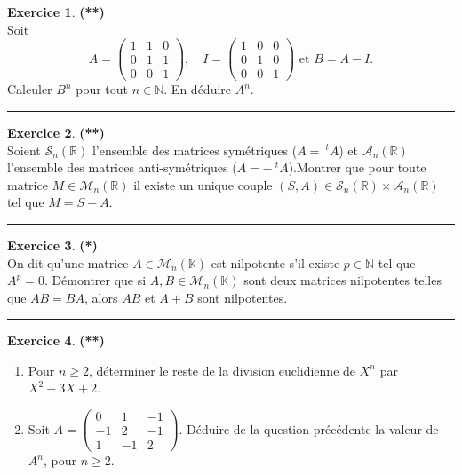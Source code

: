 \documentclass[a4paper,11pt]{article}
\theoremstyle{definition}
\newtheorem{exo}{Exercice} %
\begin{document}
\begin{minipage}{1\linewidth}
	\begin{minipage}[t]{0.48\linewidth}
		\raggedright
		
		
		
		
		\begin{exo}\textbf{(**)}\quad\\[0.2cm]
			Soit $$A=\left(
			\begin{array}{ccc}
			1&1&0\\
			0&1&1\\
			0&0&1
			\end{array}\right),\quad
			I=\left(
			\begin{array}{ccc}
			1&0&0\\
			0&1&0\\
			0&0&1
			\end{array}\right)\textrm{ et }
			B=A-I.$$
			Calculer $B^n$ pour tout $n\in\mathbb N$. En déduire $A^n$.
			
			\centering
			\rule{1\linewidth}{0.6pt}
		\end{exo}
	
			\begin{exo}\textbf{(**)}\quad\\[0.2cm]
		Soient $\mathcal S_n(\mathbb R)$ l'ensemble des matrices symétriques ($A=\ ^t\!A$) et $\mathcal A_n(\mathbb R)$ l'ensemble des matrices anti-symétriques ($A=-\ ^t\!A$).Montrer que pour toute matrice $M\in\mathcal M_n(\mathbb R)$ il existe un unique couple $(S,A)\in\mathcal S_n(\mathbb R)\times \mathcal A_n(\mathbb R)$ tel que $M = S + A$.
		
		\centering
		\rule{1\linewidth}{0.6pt}
	\end{exo}
		
		
	\end{minipage}	
	\hfill\vrule\hfill
	\begin{minipage}[t]{0.48\linewidth}
		\raggedright
		
		\begin{exo}\textbf{(*)}\quad\\[0.2cm]
			On dit qu'une matrice $A\in\mathcal M_n(\mathbb K)$ est nilpotente s'il existe $p\in\mathbb N$ tel que $A^p=0$. Démontrer que si $A,B\in\mathcal M_n(\mathbb K)$ sont deux matrices nilpotentes telles que $AB=BA$, alors $AB$ et $A+B$ sont nilpotentes.
			
			\centering
			\rule{1\linewidth}{0.6pt}
		\end{exo}
	
			\begin{exo}\textbf{(**)}\quad\\[0.2cm]
		\begin{enumerate}
			\item Pour $n\geq 2$, déterminer le reste de la division euclidienne de $X^n$ par $X^2-3X+2$.
			\item Soit  $A=\begin{pmatrix} 
			0&1&-1\\
			-1&2&-1\\
			1&-1&2
			\end{pmatrix}$. Déduire de la question précédente la valeur de $A^n$, pour $n\geq 2$.
		\end{enumerate}
		

\end{exo}
\end{minipage}
\end{minipage}
\end{document}
